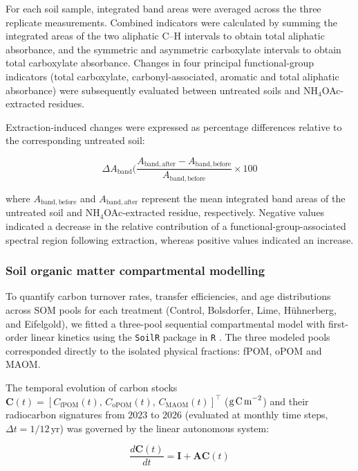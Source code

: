 \documentclass[preprint,12pt]{elsarticle}
\begin{document}
For each soil sample, integrated band areas were averaged across the three replicate measurements. Combined indicators were calculated by summing the integrated areas of the two aliphatic C--H intervals to obtain total aliphatic absorbance, and the symmetric and asymmetric carboxylate intervals to obtain total carboxylate absorbance. Changes in four principal functional-group indicators (total carboxylate, carbonyl-associated, aromatic and total aliphatic absorbance) were subsequently evaluated between untreated soils and NH$_4$OAc-extracted residues.

Extraction-induced changes were expressed as percentage differences relative to the corresponding untreated soil:

\begin{equation}
\Delta A_{\mathrm{band}} (%
\frac{
A_{\mathrm{band,after}} -
A_{\mathrm{band,before}}
}{
A_{\mathrm{band,before}}
}
\times 100
\label{eq:ftir_percentage_change}
\end{equation}

where $A_{\mathrm{band,before}}$ and $A_{\mathrm{band,after}}$ represent the mean integrated band areas of the untreated soil and NH$_4$OAc-extracted residue, respectively. Negative values indicated a decrease in the relative contribution of a functional-group-associated spectral region following extraction, whereas positive values indicated an increase. 

\subsubsection{Soil organic matter compartmental modelling}

To quantify carbon turnover rates, transfer efficiencies, and age distributions across SOM pools for each treatment (Control, Bolsdorfer, Lime, H\"{u}hnerberg, and Eifelgold), we fitted a three-pool sequential compartmental model with first-order linear kinetics using the \texttt{SoilR} package \citep{Sierra2012, Sierra2014} in \texttt{R} \citep{RCoreTeam2025}. The three modeled pools corresponded directly to the isolated physical fractions: fPOM, oPOM and MAOM.

The temporal evolution of carbon stocks $\mathbf{C}(t) = [C_{\text{fPOM}}(t),\, C_{\text{oPOM}}(t),\, C_{\text{MAOM}}(t)]^{\top}$ ($\text{g\,C\,m}^{-2}$) and their radiocarbon signatures from $2023$ to $2026$ (evaluated at monthly time steps, $\Delta t = 1/12\,\text{yr}$) was governed by the linear autonomous system:

\begin{equation}
\frac{d\mathbf{C}(t)}{dt} = \mathbf{I} + \mathbf{A}\mathbf{C}(t)
\end{equation}
\end{document}
